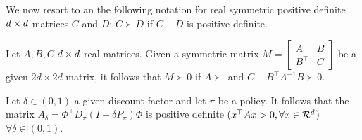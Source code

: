 We now resort to an the following notation for real symmetric positive definite $d \times d$ matrices $C$ and $D$: $C\succ D$ if $C-D$ is positive definite.
\begin{lemma}\label{lm:schur}
Let $A,B,C$ $d \times d$ real matrices. Given a symmetric matrix $M=\left[\begin{matrix}A&B \\B^\top &C\end{matrix}\right]$ be a given $2d\times 2d$ matrix, it follows that $M\succ 0$ if	$A\succ$ and $C-B^\top A^{-1}B\succ 0$.
\end{lemma}

\begin{lemma}\label{lm:amat}
Let $\delta\in(0,1)$ a given discount factor and let $\pi$ be a policy. It follows that the matrix $A_\delta=\Phi^\top D_\pi(I-\delta P_\pi)\Phi$ is positive definite ($x^\top Ax>0,\forall x \in \mathcal{R}^d$) $\forall \delta\in(0,1)$.
\end{lemma}

